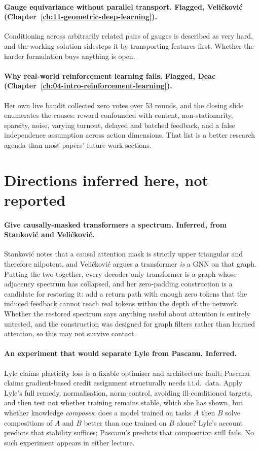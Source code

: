 \paragraph{Gauge equivariance without parallel transport. Flagged, Veli\v{c}kovi\'{c}
(Chapter~\ref{ch:11-geometric-deep-learning}).} Conditioning across arbitrarily related pairs of
gauges is described as very hard, and the working solution sidesteps it by transporting features
first. Whether the harder formulation buys anything is open.

\paragraph{Why real-world reinforcement learning fails. Flagged, Deac
(Chapter~\ref{ch:04-intro-reinforcement-learning}).} Her own live bandit collected zero votes over 53
rounds, and the closing slide enumerates the causes: reward confounded with content,
non-stationarity, sparsity, noise, varying turnout, delayed and batched feedback, and a false
independence assumption across action dimensions. That list is a better research agenda than most
papers' future-work sections.

\section*{Directions inferred here, not reported}

\paragraph{Give causally-masked transformers a spectrum. Inferred, from Stankovi\'{c} and
Veli\v{c}kovi\'{c}.} Stankovi\'{c} notes that a causal attention mask is strictly upper triangular and
therefore nilpotent, and Veli\v{c}kovi\'{c} argues a transformer \emph{is} a GNN on that graph. Putting
the two together, every decoder-only transformer is a graph whose adjacency spectrum has collapsed,
and her zero-padding construction is a candidate for restoring it: add a return path with enough zero
tokens that the induced feedback cannot reach real tokens within the depth of the network. Whether
the restored spectrum says anything useful about attention is entirely untested, and the construction
was designed for graph filters rather than learned attention, so this may not survive contact.

\paragraph{An experiment that would separate Lyle from Pascanu. Inferred.} Lyle claims plasticity
loss is a fixable optimiser and architecture fault; Pascanu claims gradient-based credit assignment
structurally needs i.i.d.\ data. Apply Lyle's full remedy, normalisation, norm control, avoiding
ill-conditioned targets, and then test not whether training remains stable, which she has shown, but
whether knowledge \emph{composes}: does a model trained on tasks $A$ then $B$ solve compositions of
$A$ and $B$ better than one trained on $B$ alone? Lyle's account predicts that stability suffices;
Pascanu's predicts that composition still fails. No such experiment appears in either lecture.

